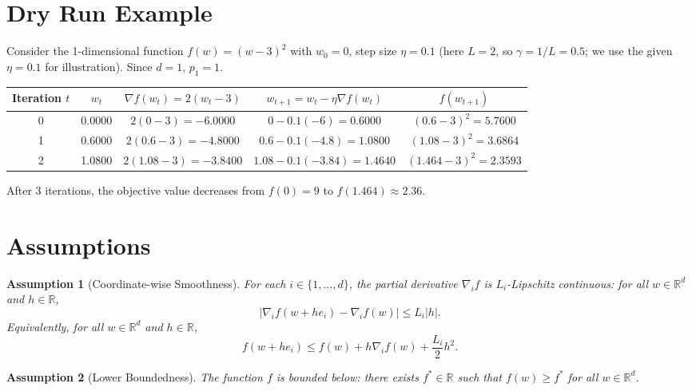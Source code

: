 \documentclass{article}
\newtheorem{assumption}{Assumption}
\newcommand{\R}{\mathbb{R}}
\begin{document}
\section*{Dry Run Example}

Consider the 1-dimensional function $f(w) = (w-3)^2$ with $w_0 = 0$, step size $\eta = 0.1$ (here $L=2$, so $\gamma = 1/L = 0.5$; we use the given $\eta=0.1$ for illustration). Since $d=1$, $p_1=1$.

\begin{center}
\begin{tabular}{c|c|c|c|c}
\textbf{Iteration $t$} & $w_t$ & $\nabla f(w_t) = 2(w_t-3)$ & $w_{t+1} = w_t - \eta \nabla f(w_t)$ & $f(w_{t+1})$ \\
\hline
0 & 0.0000 & $2(0-3) = -6.0000$ & $0 - 0.1(-6) = 0.6000$ & $(0.6-3)^2 = 5.7600$ \\
1 & 0.6000 & $2(0.6-3) = -4.8000$ & $0.6 - 0.1(-4.8) = 1.0800$ & $(1.08-3)^2 = 3.6864$ \\
2 & 1.0800 & $2(1.08-3) = -3.8400$ & $1.08 - 0.1(-3.84) = 1.4640$ & $(1.464-3)^2 = 2.3593$ \\
\end{tabular}
\end{center}

After 3 iterations, the objective value decreases from $f(0)=9$ to $f(1.464)\approx 2.36$.

\section*{Assumptions}

\begin{assumption}[Coordinate-wise Smoothness]
\label{assump:smooth}
For each $i \in \{1,\dots,d\}$, the partial derivative $\nabla_i f$ is $L_i$-Lipschitz continuous: for all $w \in \R^d$ and $h \in \R$,
\begin{equation}
|\nabla_i f(w + h e_i) - \nabla_i f(w)| \le L_i |h|.
\end{equation}
Equivalently, for all $w \in \R^d$ and $h \in \R$,
\begin{equation}
f(w + h e_i) \le f(w) + h \nabla_i f(w) + \frac{L_i}{2} h^2. \tag{Descent Lemma}
\end{equation}
\end{assumption}

\begin{assumption}[Lower Boundedness]
\label{assump:bounded}
The function $f$ is bounded below: there exists $f^* \in \R$ such that $f(w) \ge f^*$ for all $w \in \R^d$.
\end{assumption}
\end{document}
